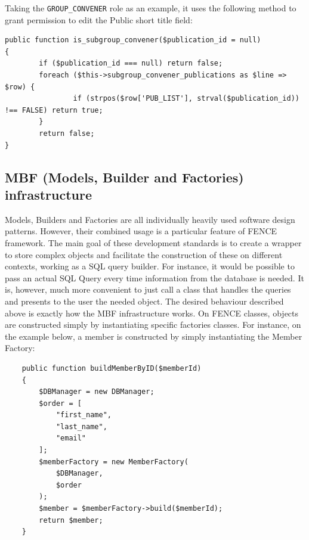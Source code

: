Taking the \texttt{GROUP\_CONVENER} role as an example, it uses the following method to grant permission to edit the Public short title field:

\begin{lstlisting}
public function is_subgroup_convener($publication_id = null)
{
        if ($publication_id === null) return false;
        foreach ($this->subgroup_convener_publications as $line => $row) {
                if (strpos($row['PUB_LIST'], strval($publication_id)) !== FALSE) return true;
        }
        return false;
}
\end{lstlisting}


\subsection{MBF (Models, Builder and Factories) infrastructure}%
\label{sec:MBF_Models_Builder_and_Factories_infrastructure}

Models, Builders and Factories are all individually heavily used software design patterns.
However, their combined usage is a particular feature of FENCE framework.
The main goal of these development standards is to create a wrapper to store complex objects and facilitate the construction of these on different contexts, working as a SQL query builder.
For instance, it would be possible to pass an actual SQL Query every time information from the database is needed.
It is, however, much more convenient to just call a class that handles the queries and presents to the user the needed object.
The desired behaviour described above is exactly how the MBF infrastructure works.
On FENCE classes, objects are constructed simply by instantiating specific factories classes.
For instance, on the example below, a member is constructed by simply instantiating the Member Factory:

\begin{lstlisting}
    public function buildMemberByID($memberId)
    {
        $DBManager = new DBManager;
        $order = [
            "first_name",
            "last_name",
            "email"
        ];
        $memberFactory = new MemberFactory(
            $DBManager,
            $order
        );
        $member = $memberFactory->build($memberId);
        return $member;
    }
\end{lstlisting}

